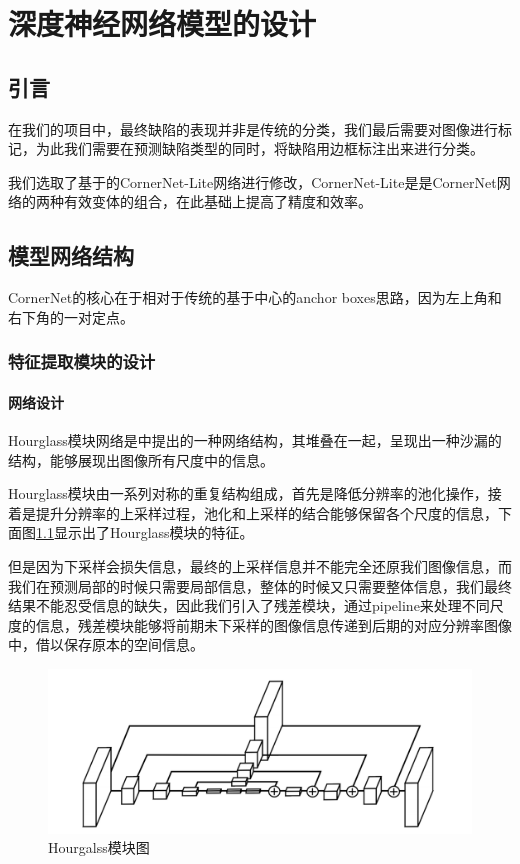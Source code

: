 \chapter{深度神经网络模型的设计}
\section{引言}

在我们的项目中，最终缺陷的表现并非是传统的分类，我们最后需要对图像进行标记，为此我们需要在预测缺陷类型的同时，将缺陷用边框标注出来进行分类。

我们选取了基于\cite{DBLP:journals/corr/abs-1904-08900}的CornerNet-Lite网络进行修改，CornerNet-Lite是是CornerNet网络的两种有效变体的组合，在此基础上提高了精度和效率。

\section{模型网络结构}

CornerNet的核心在于相对于传统的基于中心的anchor boxes思路，因为左上角和右下角的一对定点。 

\subsection{特征提取模块的设计}
\subsubsection{网络设计}

Hourglass模块网络是\cite{DBLP:journals/corr/NewellYD16}中提出的一种网络结构，其堆叠在一起，呈现出一种沙漏的结构，能够展现出图像所有尺度中的信息。

Hourglass模块由一系列对称的重复结构组成，首先是降低分辨率的池化操作，接着是提升分辨率的上采样过程，池化和上采样的结合能够保留各个尺度的信息，下面图\ref{fig:hourglass}显示出了Hourglass模块的特征。

但是因为下采样会损失信息，最终的上采样信息并不能完全还原我们图像信息，而我们在预测局部的时候只需要局部信息，整体的时候又只需要整体信息，我们最终结果不能忍受信息的缺失，因此我们引入了残差模块，通过pipeline来处理不同尺度的信息，残差模块能够将前期未下采样的图像信息传递到后期的对应分辨率图像中，借以保存原本的空间信息。


\begin{figure}[!tbp]
    \centering
    \includegraphics[width=\textwidth]{figures/hourglass.png}
    \caption{Hourgalss模块图\cite{newell2016stacked}}
    \vspace{-1em}
    \label{fig:hourglass}
\end{figure}

